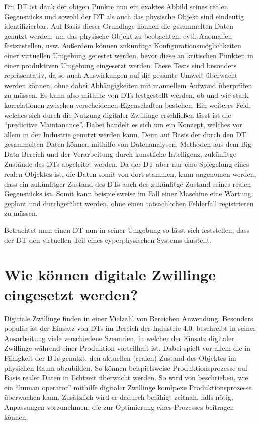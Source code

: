 Ein \ac{DT} ist dank der obigen Punkte nun ein exaktes Abbild seines realen Gegenstücks und sowohl der \ac{DT} als auch das physische Objekt sind eindeutig identifizierbar. Auf Basis dieser Grundlage können die gesammelten Daten genutzt werden, um das physische Objekt zu beobachten, evtl. Anomalien festzustellen, usw. Außerdem können zukünfitge Konfigurationsmöglichkeiten einer virtuellen Umgebung getestet werden, bevor diese an kritischen Punkten in einer produktiven Umgebung eingesetzt werden. Diese Tests sind besonders repräsentativ, da so auch Auswirkungen auf die gesamte Umwelt überwacht werden können, ohne dabei Abhängigkeiten mit manuellem Aufwand überprüfen zu müssen. Es kann also mithilfe von \ac{DT}s festgestellt werden, ob und wie stark korrelationen zwischen verscheidenen Eigenschaften bestehen. Ein weiteres Feld, welches sich durch die Nutzung digitaler Zwillinge erschließen lässt ist die \enquote{predicitve Maintanance}. Dabei handelt es sich um ein Konzept, welches vor allem in der Industrie genutzt werden kann. Denn auf Basis der durch den \ac{DT} gesammelten Daten können mithilfe von Datenanalysen, Methoden aus dem Big-Data Bereich und der Verarbeitung durch kunstliche Intelligenz, zukünfitge Zustände des \ac{DT}s abgeleitet werden. Da der \ac{DT} aber nur eine Spiegelung eines realen Objektes ist, die Daten somit von dort stammen, kann angenomen werden, dass ein zukünfitger Zustand des \ac{DT}s auch der zukünfitge Zustand seines realen Gegenstücks ist. Somit kann beispielsweise im Fall einer Maschine eine Wartung geplant und durchgeführt werden, ohne einen tatsächlichen Fehlerfall registrieren zu müssen.

Betrachtet man einen \ac{DT} nun in seiner Umgebung so lässt sich feststellen, dass der \ac{DT} den virtuellen Teil eines cyperphysischen Systems darstellt.

\section{Wie können digitale Zwillinge eingesetzt werden?}

Digitiale Zwillinge finden in einer Vielzahl von Bereichen Anwendung. Besonders populär ist der Einsatz von \ac{DT}s im Bereich der Industrie 4.0. \citeauthor{tao2018digital} beschreibt in seiner Ausarbeitung viele verschiedene Szenarien, in welcher der Einsatz digitaler Zwillinge während einer Produktion vorteilhaft ist. Dabei spielt vor allem die in Fähigkeit der \ac{DT}s genutzt, den aktuellen (realen) Zustand des Objektes im physichen Raum abzubilden. So können beispielsweise Produktionsprozesse auf Basis realer Daten in Echtzeit überwacht werden. \autocite{tao2018digital} So wird von \citeauthor{weyer2016future} beschrieben, wie ein \enquote{human operator} mithilfe digitaler Zwillinge komlpexe Produktionsprozesse überwachen kann. Zusätzlich wird er dadurch befähigt zeitnah, falls nötig, Anpassungen vorzunehmen, die zur Optimierung eines Prozesses beitragen können.\autocite{weyer2016future}

